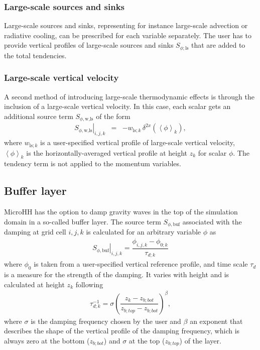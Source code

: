 \documentclass[gmd,manuscript]{copernicus}
\begin{document}
\subsubsection{Large-scale sources and sinks}
Large-scale sources and sinks, representing for instance large-scale advection or radiative cooling, can be prescribed for each variable separately. The user has to provide vertical profiles of large-scale sources and sinks $S_{\phi;\textrm{ls}}$ that are added to the total tendencies.

\subsubsection{Large-scale vertical velocity}
A second method of introducing large-scale thermodynamic effects is through the inclusion of a large-scale vertical velocity. In this case, each scalar gets an additional source term $S_{\phi,\textrm{w,ls}}$  of the form
\begin{eqnarray}
\left. S_{\phi,\textrm{w,ls}} \right|_{i,j,k} & = &  - w_{\textrm{ls};k}\,\delta^{2x} \left( \left< \phi \right>_k \right),
\end{eqnarray}
where $w_{\textrm{ls};k}$ is a user-specified vertical profile of large-scale vertical velocity, $\left< \phi \right>_k$ is the horizontally-averaged vertical profile at height $z_k$ for scalar $\phi$. The tendency term is not applied to the momentum variables.

\subsection{Buffer layer}
MicroHH has the option to damp gravity waves in the top of the simulation domain in a so-called buffer layer.  The source term  $S_{\phi,\textrm{buf}}$ associated with the damping at grid cell $i,j,k$ is calculated for an arbitrary variable $\phi$ as
\begin{eqnarray}
\left. S_{\phi,\textrm{buf}} \right|_{i,j,k} = \dfrac{\phi_{i,j,k} - \phi_{0;k}}{\tau_{d;k}}
\end{eqnarray}
where $\phi_0$ is taken from a user-specified vertical reference profile, and time scale $\tau_d$ is a measure for the strength of the damping. It varies with height and is calculated at height $z_k$ following
\begin{eqnarray}
\tau_{d;k}^{-1} = \sigma \left( \dfrac{z_k - z_{b;bot} }{z_{b;top} - z_{b;bot}} \right)^\beta,
\end{eqnarray}
where $\sigma$ is the damping frequency chosen by the user and $\beta$ an exponent that describes the shape of the vertical profile of the damping frequency, which is always zero at the bottom ($z_{b;bot}$) and $\sigma$ at the top ($z_{b;top}$)  of the layer.
\end{document}
